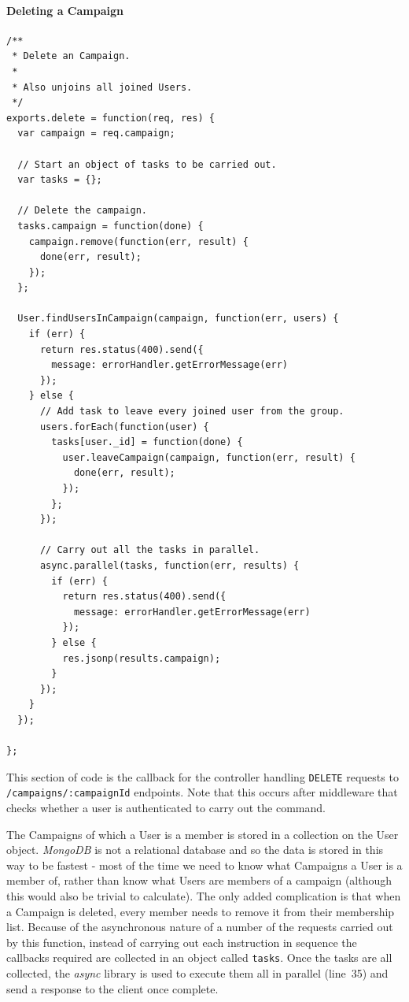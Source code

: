 \documentclass{article}
\begin{document}
	\paragraph{Deleting a Campaign}

	\begin{verbatim}
/**
 * Delete an Campaign.
 *
 * Also unjoins all joined Users.
 */
exports.delete = function(req, res) {
  var campaign = req.campaign;

  // Start an object of tasks to be carried out.
  var tasks = {};

  // Delete the campaign.
  tasks.campaign = function(done) {
    campaign.remove(function(err, result) {
      done(err, result);
    });
  };

  User.findUsersInCampaign(campaign, function(err, users) {
    if (err) {
      return res.status(400).send({
        message: errorHandler.getErrorMessage(err)
      });
    } else {
      // Add task to leave every joined user from the group.
      users.forEach(function(user) {
        tasks[user._id] = function(done) {
          user.leaveCampaign(campaign, function(err, result) {
            done(err, result);
          });
        };
      });

      // Carry out all the tasks in parallel.
      async.parallel(tasks, function(err, results) {
        if (err) {
          return res.status(400).send({
            message: errorHandler.getErrorMessage(err)
          });
        } else {
          res.jsonp(results.campaign);
        }
      });
    }
  });

};
	\end{verbatim}

	This section of code is the callback for the controller handling \texttt{DELETE} requests to \texttt{/campaigns/:campaignId} endpoints. Note that this occurs after middleware that checks whether a user is authenticated to carry out the command.

	The Campaigns of which a User is a member is stored in a collection on the User object. \emph{MongoDB} is not a relational database and so the data is stored in this way to be fastest - most of the time we need to know what Campaigns a User is a member of, rather than know what Users are members of a campaign (although this would also be trivial to calculate). The only added complication is that when a Campaign is deleted, every member needs to remove it from their membership list. Because of the asynchronous nature of a number of the requests carried out by this function, instead of carrying out each instruction in sequence the callbacks required are collected in an object called \texttt{tasks}. Once the tasks are all collected, the \emph{async} library is used to execute them all in parallel (line~35) and send a response to the client once complete.
\end{document}
